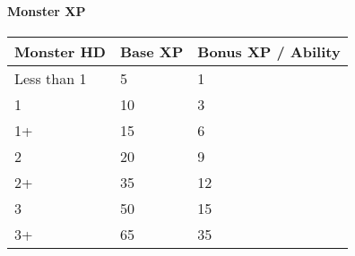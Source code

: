 \paragraph{Monster XP}
\begin{tabular}{l l l}
    Monster HD & Base XP & Bonus XP / Ability \\
    \hline
    Less than 1 & 5 & 1\\
    1 & 10 & 3\\
    1+ & 15 & 6 \\
    2 & 20 & 9\\
    2+ & 35 & 12 \\
    3 & 50 & 15 \\
    3+ & 65 & 35 \\
\end{tabular}
